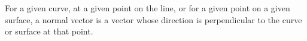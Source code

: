 For a given curve, at a given point on the line, or for a given point on a given
surface, a normal vector is a vector whose direction is perpendicular
to the curve or surface at that point.